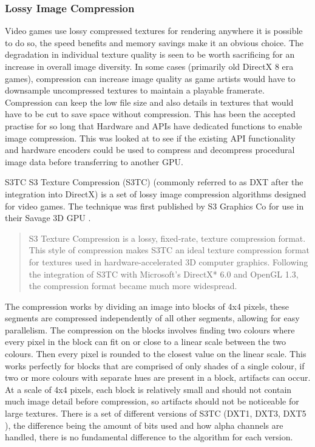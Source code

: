\documentclass[12pt,a4paper]{article}
\begin{document}
\subsubsection{Lossy Image Compression}
Video games use lossy compressed textures for rendering anywhere it is possible to do so, the speed benefits and memory savings make it an obvious choice. The degradation in individual texture quality is seen to be worth sacrificing for an increase in overall image diversity. In some cases (primarily old DirectX 8 era games), compression can increase image quality as game artists would have to downsample uncompressed textures to maintain a playable framerate. Compression can keep the low file size and also details in textures that would have to be cut to save space without compression. This has been the accepted practise for so long that Hardware and APIs have dedicated functions to enable image compression. This was looked at to see if the existing API functionality and hardware encoders could be used to compress and decompress procedural image data before transferring to another GPU.

S3TC 
S3 Texture Compression (S3TC) (commonly referred to as DXT after the integration into DirectX) is a set of lossy image compression algorithms designed for video games. The technique was first published by S3 Graphics Co for use in their Savage 3D GPU \cite{hong2004fixed} .

\blockquote[\cite{anddxt}]{S3 Texture Compression is a lossy, fixed-rate, texture compression format. This style of compression makes S3TC an ideal texture compression format for textures used in hardware-accelerated 3D computer graphics. Following the integration of S3TC with Microsoft’s DirectX* 6.0 and OpenGL 1.3, the compression format became much more widespread.}

The compression works by dividing an image into blocks of 4x4 pixels, these segments are compressed independently of all other segments, allowing for easy parallelism. The compression on the blocks involves finding two colours where every pixel in the block can fit on or close to a linear scale between the two colours. Then every pixel is rounded to the closest value on the linear scale.
This works perfectly for blocks that are comprised of only shades of a single colour, if two or more colours with separate hues are present in a block, artifacts can occur. At a scale of 4x4 pixels, each block is relatively small and should not contain much image detail before compression, so artifacts should not be noticeable for large textures. There is a set of different versions of S3TC (DXT1, DXT3, DXT5 ), the difference being the amount of bits used and how alpha channels are handled, there is no fundamental difference to the algorithm for each version.
\end{document}
